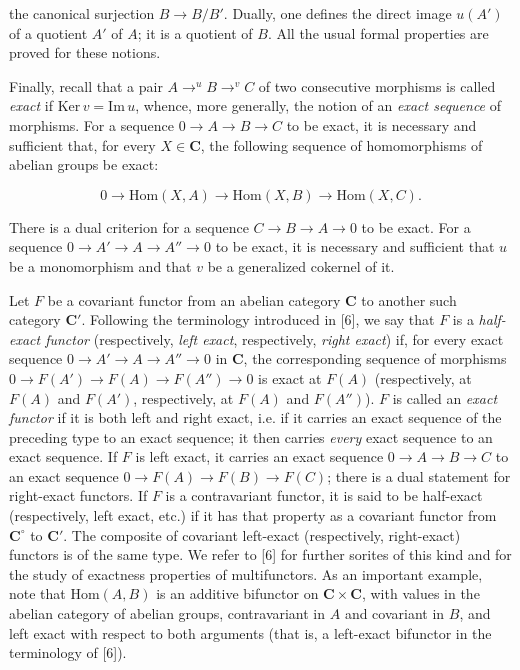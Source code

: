 
\noindent the canonical surjection $B\to B/B'$. Dually, one
defines the direct image $u(A')$ of a quotient $A'$ of $A$; it is a quotient
of $B$. All the usual formal properties are proved for these notions.

Finally, recall that a pair $A\mathrel{\mathop{\to}^{u}}B \mathrel{\mathop{\to}^{v}}C$ of two consecutive morphisms is called \textit{exact} if
$\mathrm{Ker}\,v=\mathrm{Im}\,u$, whence, more generally, the notion of an
\textit{exact sequence} of morphisms. For a sequence $0\to A\to B\to C$ to be exact, it is necessary and sufficient that, for every
$X\in\mathbf{C}$, the following sequence of homomorphisms of abelian groups be exact:

\[
  0\to\mathrm{Hom}(X,A)\to\mathrm{Hom}(X,B)
  \to\mathrm{Hom}(X,C).
\]

\noindent There is a dual criterion for a sequence
$C\to B\to A\to0$ to be exact. For a
sequence $0\to A'\to A\to A''\to0$ to be exact, it is necessary and sufficient that $u$ be a
monomorphism and that $v$ be a generalized cokernel of it.

Let $F$ be a covariant functor from an abelian category $\mathbf{C}$ to another such
category $\mathbf{C}'$. Following the terminology introduced in [6], we say that $F$ is
a \textit{half-exact functor} (respectively, \textit{left exact}, respectively,
\textit{right exact}) if, for every exact sequence $0\to A'\to A\to A''\to0$ in $\mathbf{C}$, the corresponding sequence of morphisms $0\to F(A')\to F(A)\to F(A'') \to0$ is exact at $F(A)$ (respectively, at $F(A)$ and $F(A')$,
respectively, at $F(A)$ and $F(A'')$). $F$ is called an \textit{exact functor}
if it is both left and right exact, i.e. if it carries an exact sequence of the
preceding type to an exact sequence; it then carries \textit{every} exact
sequence to an exact sequence. If $F$ is left exact, it carries an exact
sequence $0\to A\to B\to C$ to an exact sequence $0\to F(A)\to F(B)\to F(C)$; there is a dual statement for right-exact functors. If $F$ is a
contravariant functor, it is said to be half-exact (respectively, left exact,
etc.) if it has that property as a covariant functor from $\mathbf{C}^\circ$ to $\mathbf{C}'$.
The composite of covariant left-exact (respectively, right-exact) functors is
of the same type. We refer to [6] for further sorites of this kind and for the
study of exactness properties of multifunctors. As an important example, note
that $\mathrm{Hom}(A,B)$ is an additive bifunctor on $\mathbf{C}\times\mathbf{C}$, with values
in the abelian category of abelian groups, contravariant in $A$ and covariant
in $B$, and left exact with respect to both arguments (that is, a left-exact
bifunctor in the terminology of [6]).

